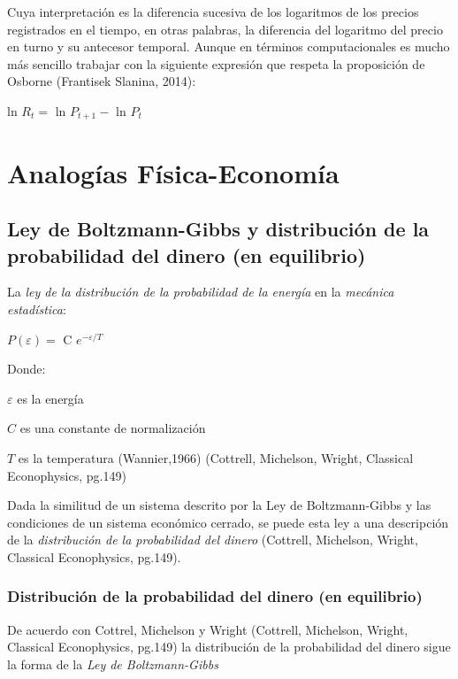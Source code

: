 Cuya interpretación es la diferencia sucesiva de los logaritmos de los precios  registrados en el tiempo, en otras palabras, la diferencia del logaritmo del precio en turno y su antecesor temporal. Aunque en términos computacionales es mucho más sencillo trabajar con la siguiente expresión que respeta la proposición de Osborne (Frantisek Slanina, 2014): 
\begin{center}
ln $R_t = $ ln $\mathit{P_{t+1}} - $ ln $\mathit{P_{t}}$
\end{center}%


\section{Analogías Física-Economía} 
\subsection{Ley de Boltzmann-Gibbs y distribución de la probabilidad del dinero (en equilibrio)} 

La \textit{ley de la distribución de la probabilidad de la energía} en la \textit{mecánica estadística}:

\begin{center}
$\mathit{P(\varepsilon)} = $ C $e^{-\varepsilon/\mathit{T}}$ 
\end{center}
Donde:

$\varepsilon$ es la energía

$C$ es una constante de normalización

$\mathit{T}$ es la temperatura (Wannier,1966) (Cottrell, Michelson, Wright, Classical Econophysics, pg.149)

Dada la similitud de un sistema descrito por la Ley de Boltzmann-Gibbs y las condiciones de un sistema económico cerrado, se puede esta ley a una descripción de la \textit{distribución de la probabilidad del dinero}
(Cottrell, Michelson, Wright, Classical Econophysics, pg.149).


\subsubsection{Distribución de la probabilidad del dinero (en equilibrio)} 


De acuerdo con Cottrel, Michelson y Wright (Cottrell, Michelson, Wright, Classical Econophysics, pg.149) la distribución de la probabilidad del dinero sigue la forma de la \textit{Ley de Boltzmann-Gibbs}


